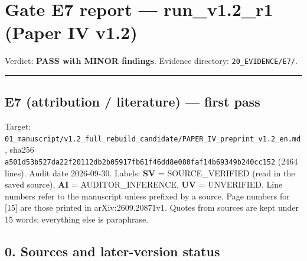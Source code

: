 \documentclass[
]{article}
\author{}
\date{}
\begin{document}
\section{Gate E7 report --- run\_v1.2\_r1 (Paper IV
v1.2)}\label{gate-e7-report--run_v12_r1-paper-iv-v12}

Verdict: \textbf{PASS with MINOR findings}. Evidence directory:
\texttt{20\_EVIDENCE/E7/}.

\begin{center}\rule{0.5\linewidth}{0.5pt}\end{center}

\subsection{E7 (attribution / literature) --- first
pass}\label{e7-attribution--literature--first-pass}

Target:
\texttt{01\_manuscript/v1.2\_full\_rebuild\_candidate/PAPER\_IV\_preprint\_v1.2\_en.md},
sha256
\texttt{a501d53b527da22f20112db2b05917fb61f46dd8e080faf14b69349b240cc152}
(2464 lines). Audit date 2026-09-30. Labels: \textbf{SV} =
SOURCE\_VERIFIED (read in the saved source), \textbf{AI} =
AUDITOR\_INFERENCE, \textbf{UV} = UNVERIFIED. Line numbers refer to the
manuscript unless prefixed by a source. Page numbers for {[}15{]} are
those printed in arXiv:2609.20871v1. Quotes from sources are kept under
15 words; everything else is paraphrase.

\subsection{0. Sources and later-version
status}\label{0-sources-and-later-version-status}
\end{document}
